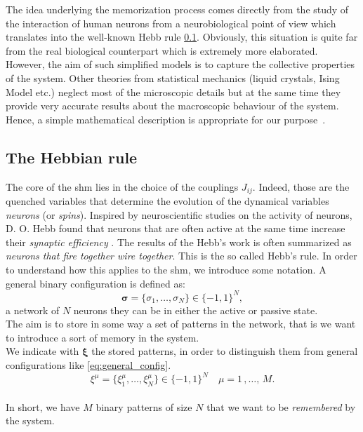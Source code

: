 \documentclass[\rootdir/main.tex]{subfiles}
\begin{document}
The idea underlying the memorization process comes directly from the study of the interaction of human neurons from a neurobiological point of view which translates into the well-known Hebb rule \cref{sec:hebbrule}.
Obviously, this situation is quite far from the real biological counterpart which is extremely more elaborated. However, the aim of such simplified models is to capture the collective properties of the system. Other theories from statistical mechanics (\eg liquid crystals, Ising Model etc.) neglect most of the microscopic details but at the same time they provide very accurate results about the macroscopic behaviour of the system. Hence, a simple mathematical description is appropriate for our purpose~\cite{statmecoflearn}.

\subsection{The Hebbian rule}\label{sec:hebbrule}
The core of the \acrlong{shm} lies in the choice of the couplings $J_{ij}$. Indeed, those are the quenched variables that determine the evolution of the dynamical variables \ie \emph{neurons} (or \emph{spins}).
Inspired by neuroscientific studies on the activity of neurons, D. O. Hebb found that neurons that are often active at the same time increase their \emph{synaptic efficiency} \cite{hebb}. The results of the Hebb's work is often summarized as \emph{neurons that fire together wire together}. This is the so called Hebb's rule.
In order to understand how this applies to the \acrlong{shm}, we introduce some notation.
A general binary configuration is defined as:
\begin{equation}\label{eq:general_config}
    \symbf{\sigma} = \{\sigma_1, \dots, \sigma_N\} \in \{-1, 1\}^N,
\end{equation}
\ie a network of $N$ neurons they can be in either the active or passive state.\\
The aim is to store in some way a set of patterns in the network, that is we want to introduce a sort of memory in the system.\\
We indicate with $\symbf{\xi}$ the stored patterns, in order to distinguish them from general configurations like \cref{eq:general_config}.
\begin{equation}\label{eq:patterns}
    {\xi^\mu} = \{\xi_1^\mu, \dots, \xi_N^\mu\} \in \{-1, 1\}^N \quad \mu = 1\,, \dots,\, M.
\end{equation}\\
In short, we have $M$ binary patterns of size $N$ that we want to be \emph{remembered} by the system.
\end{document}
